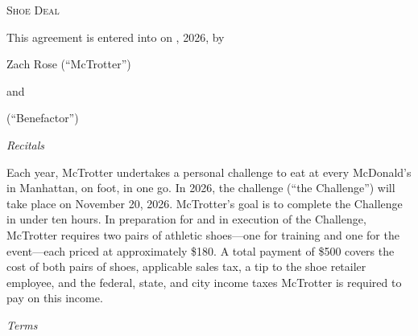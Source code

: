 \documentclass[11pt]{article}
\begin{document}
\begin{center}
{\textsc{Shoe Deal}}
\end{center}

\medskip

This agreement is entered into on \underline{\hspace{2.5cm}}, 2026, by

\noindent
\begin{minipage}[b]{0.44\textwidth}
Zach Rose (``McTrotter'')
\end{minipage}%
\begin{minipage}[b]{0.08\textwidth}
\centering and
\end{minipage}%
\begin{minipage}[b]{0.44\textwidth}
\underline{\hspace{4.5cm}} (``Benefactor'')
\end{minipage}

\medskip

\textit{Recitals}

\medskip

Each year, McTrotter undertakes a personal challenge to eat at every McDonald's in Manhattan, on foot, in one go. In 2026, the challenge (``the Challenge'') will take place on November 20, 2026. McTrotter's goal is to complete the Challenge in under ten hours. In preparation for and in execution of the Challenge, McTrotter requires two pairs of athletic shoes---one for training and one for the event---each priced at approximately \$180. A total payment of \$500 covers the cost of both pairs of shoes, applicable sales tax, a tip to the shoe retailer employee, and the federal, state, and city income taxes McTrotter is required to pay on this income.

\medskip

\textit{Terms}

\medskip
\end{document}
